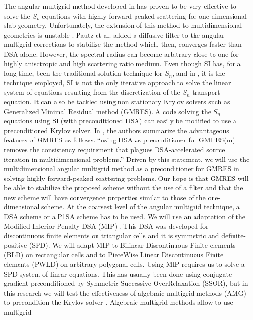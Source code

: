 The angular multigrid method developed in \cite{multigrid_1d} has proven to 
be very effective to solve the $S_n$ equations with highly forward-peaked 
scattering for one-dimensional slab geometry. Unfortunately, the extension 
of this method to multidimensional geometries is unstable \cite{multigrid_2d}. 
Pautz et al. added a diffusive filter to the angular multigrid corrections to
stabilize the method which, then, converges faster than DSA alone. However, 
the spectral radius can become arbitrary close to one for highly anisotropic 
and high scattering ratio medium. Even though SI has, for a long time, been
the traditional solution technique for $S_n$, and in
\cite{multigrid_1d,multigrid_2d}, it is the technique employed, SI is not the
only iterative approach to solve the linear system of equations resulting from
the discretization of the $S_n$ transport equation. It can also be tackled
using non stationary Krylov solvers such as Generalized Minimal Residual 
method (GMRES). A code solving the $S_n$ equations using SI (with
preconditioned DSA) can easily be modified to use a preconditioned Krylov 
solver. In \cite{ttg}, the authors summarize the advantageous features of 
GMRES as follows: ``using DSA as preconditioner for GMRES(m) removes the 
consistency requirement that plagues DSA-accelerated source iteration in 
multidimensional problems.'' Driven by this statement, we will use the 
multidimensional angular multigrid method as a preconditioner for GMRES in 
solving highly forward-peaked scattering problems. Our hope is
that GMRES will be able to stabilize the proposed scheme without the use of a
filter and that the new scheme will have convergence properties similar to
those of the one-dimensional scheme. At the coarsest level of the angular
multigrid technique, a DSA 
scheme or a P1SA scheme has to be used. We will use an adaptation of the Modified 
Interior Penalty DSA (MIP) \cite{mip}. This DSA was developed for discontinuous 
finite elements on triangular cells and it is symmetric and definite-positive 
(SPD). We will adapt MIP to Bilinear Discontinuous Finite elements (BLD) on 
rectangular cells and to PieceWise Linear Discontinuous Finite elements (PWLD) 
\cite{pwld_3d,pwld_2d} on arbitrary polygonal cells. Using MIP requires us to 
solve a SPD system of linear equations. This has 
usually been done using conjugate gradient preconditioned by Symmetric
Successive OverRelaxation (SSOR), but in this research we will test the 
effectiveness of algebraic multigrid methods (AMG) to precondition the Krylov solver 
\cite{amg,amg_course}. Algebraic multigrid methods allow to use multigrid
